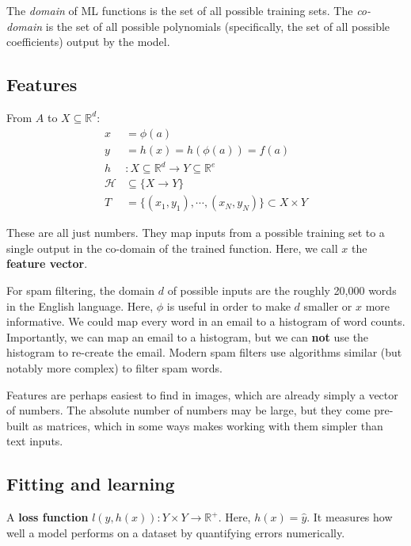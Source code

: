 \documentclass[titlepage, 12pt, leqno]{article}
\begin{document}
\begin{note}
    The \textit{domain} of ML functions is the set of all possible training sets.
    The \textit{co-domain} is the set of all possible polynomials (specifically,
    the set of all possible coefficients) output by the model.
\end{note}

\subsection{Features}
From $A$ to $X \subseteq \mathbb{R}^{d}$:
\begin{align*}
    x &= \phi(a) \\
    y &= h(x) = h(\phi (a)) = f(a) \\
    h &: X \subseteq \mathbb{R}^{d} \rightarrow 
    Y \subseteq \mathbb{R}^{e} \\
    \mathcal{H} &\subseteq \{X \rightarrow Y\} \\
    T &= \{(x_1,y_1), \cdots , (x_N, y_N)\} \subset X \times Y
\end{align*}

\begin{definition}
    These are all just numbers. They map inputs from a possible training
    set to a single output in the co-domain of the trained function. Here, we call
    $x$ the \textbf{feature vector}.
\end{definition}
    
\begin{ex}
    For spam filtering, the domain $d$ of possible inputs are the roughly 
    20,000 words in the English language. Here, $\phi $ is useful in order to 
    make $d$ smaller or $x$ more informative. We could map every word in an email
    to a histogram of word counts. Importantly, we can map an email to a
    histogram, but we can \textbf{not} use the histogram to re-create the email.
    Modern spam filters use algorithms similar (but notably more complex) to 
    filter spam words.
\end{ex}

Features are perhaps easiest to find in images, which are already simply a 
vector of numbers. The absolute number of numbers may be large, but they come
pre-built as matrices, which in some ways makes working with them simpler than
text inputs.

\subsection{Fitting and learning}
\begin{definition}
    A \textbf{loss function} $l(y, h(x)) : Y \times Y \rightarrow \mathbb{R}^{+}$.
    Here, $h(x) = \hat y$. It measures how well a model performs on a dataset by
    quantifying errors numerically.
\end{definition}
\end{document}
